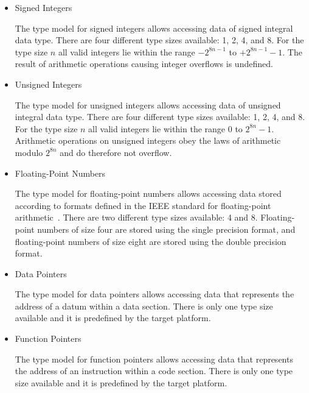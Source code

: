 \begin{itemize}

\item Signed Integers\alignright{}\nopagebreak

The type model for signed integers allows accessing data of signed integral data type.
There are four different type sizes available: 1, 2, 4, and 8.
For the type size $n$ all valid integers lie within the range $-2^{8n-1}$ to $+2^{8n-1}-1$.
The result of arithmetic operations causing integer overflows is undefined.

\item Unsigned Integers\alignright{}\nopagebreak

The type model for unsigned integers allows accessing data of unsigned integral data type.
There are four different type sizes available: 1, 2, 4, and 8.
For the type size $n$ all valid integers lie within the range $0$ to $2^{8n}-1$.
Arithmetic operations on unsigned integers obey the laws of arithmetic modulo $2^{8n}$ and do therefore not overflow.

\item Floating-Point Numbers\alignright{}\nopagebreak

The type model for floating-point numbers allows accessing data stored according to formats defined in the IEEE standard for floating-point arithmetic~\cite{ieee1985}.
There are two different type sizes available: 4 and 8.
Floating-point numbers of size four are stored using the single precision format,
and floating-point numbers of size eight are stored using the double precision format.

\item Data Pointers\alignright{}\nopagebreak

The type model for data pointers allows accessing data that represents the address of a datum within a data section.
There is only one type size available and it is predefined by the target platform.

\item Function Pointers\alignright{}\nopagebreak

The type model for function pointers allows accessing data that represents the address of an instruction within a code section.
There is only one type size available and it is predefined by the target platform.

\end{itemize}

